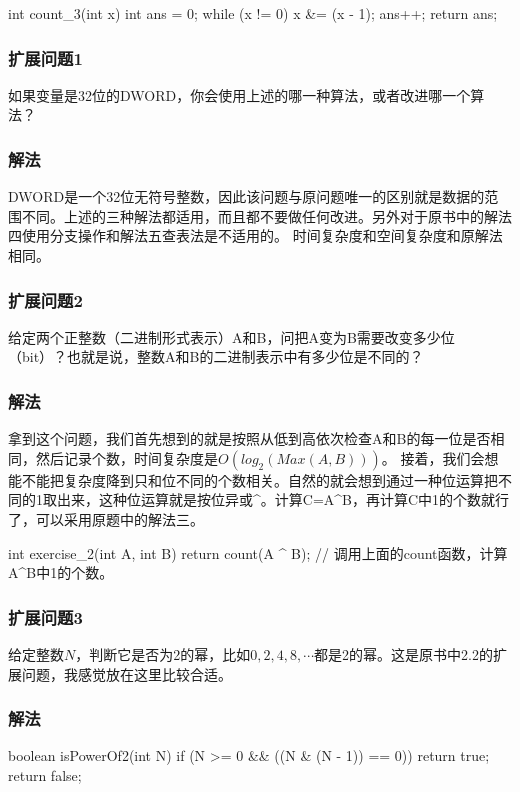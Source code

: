 \begin{Codex}[label={[$O(M)+O(1)$]Chap02_01_NumberOfOnes.java}]
int count_3(int x) {
    int ans = 0;
    while (x != 0) {
        x &= (x - 1);
        ans++;
    }
    return ans;
}
\end{Codex}

\subsubsection{扩展问题1}
如果变量是32位的DWORD，你会使用上述的哪一种算法，或者改进哪一个算法？

\subsubsection{解法}
DWORD是一个32位无符号整数，因此该问题与原问题唯一的区别就是数据的范围不同。上述的三种解法都适用，而且都不要做任何改进。另外对于原书中的解法四使用分支操作和解法五查表法是不适用的。
时间复杂度和空间复杂度和原解法相同。

\subsubsection{扩展问题2}
给定两个正整数（二进制形式表示）A和B，问把A变为B需要改变多少位（bit）？也就是说，整数A和B的二进制表示中有多少位是不同的？

\subsubsection{解法}
拿到这个问题，我们首先想到的就是按照从低到高依次检查A和B的每一位是否相同，然后记录个数，时间复杂度是$O(log_2(Max(A,B)))$。
接着，我们会想能不能把复杂度降到只和位不同的个数相关。自然的就会想到通过一种位运算把不同的1取出来，这种位运算就是按位异或\^{}。计算C=A\^{}B，再计算C中1的个数就行了，可以采用原题中的解法三。


\begin{Codex}[label={[$O(M)+O(1)$]Chap02_01_NumberOfOnes.java}]
int exercise_2(int A, int B) {
    return count(A ^ B);	// 调用上面的count函数，计算A^B中1的个数。
}
\end{Codex}

\subsubsection{扩展问题3}
给定整数$N$，判断它是否为2的幂，比如$0,2,4,8,\cdots$都是2的幂。这是原书中2.2的扩展问题，我感觉放在这里比较合适。

\subsubsection{解法}
\begin{Codex}[label={[$O(1)+O(1)$]Chap02_01_NumberOfOnes.java}]
boolean isPowerOf2(int N) {
    if (N >= 0 && ((N & (N - 1)) == 0)) return true;
    return false;
}
\end{Codex}

